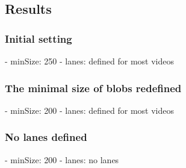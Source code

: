 \begin{table}[]
\caption{My caption}
\label{my-label}
\end{table}

\subsection{Results}
\subsubsection{Initial setting}
- minSize: 250
- lanes: defined for most videos

\subsubsection{The minimal size of blobs redefined}
- minSize: 200
- lanes: defined for most videos

\subsubsection{No lanes defined}
- minSize: 200
- lanes: no lanes

